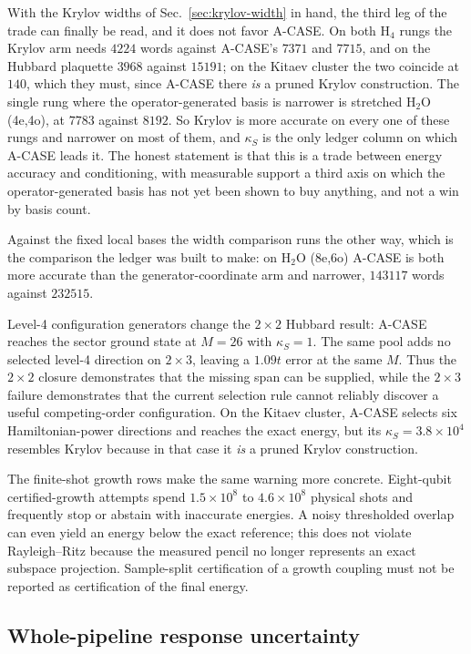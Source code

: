 \documentclass[aps,pra,reprint,superscriptaddress,nofootinbib,floatfix]{revtex4-2}
\begin{document}
With the Krylov widths of Sec.~\ref{sec:krylov-width} in hand, the third leg
of the trade can finally be read, and it does not favor A-CASE.  On both H$_4$
rungs the Krylov arm needs $4224$ words against A-CASE's $7371$ and $7715$,
and on the Hubbard plaquette $3968$ against $15191$; on the Kitaev cluster the
two coincide at $140$, which they must, since A-CASE there \emph{is} a pruned
Krylov construction.  The single rung where the operator-generated basis is
narrower is stretched H$_2$O (4e,4o), at $7783$ against $8192$.  So Krylov is
more accurate on every one of these rungs and narrower on most of them, and
$\kappa_S$ is the only ledger column on which A-CASE leads it.  The honest
statement is that this is a trade between energy accuracy and conditioning,
with measurable support a third axis on which the operator-generated basis has
not yet been shown to buy anything, and not a win by basis count.

Against the fixed local bases the width comparison runs the other way, which
is the comparison the ledger was built to make: on H$_2$O (8e,6o) A-CASE is
both more accurate than the generator-coordinate arm and narrower, $143117$
words against $232515$.

Level-4 configuration generators change the $2\times2$ Hubbard result:
A-CASE reaches the sector ground state at $M=26$ with
$\kappa_S=1$.  The same pool adds no selected level-4 direction on
$2\times3$, leaving a $1.09t$ error at the same $M$.  Thus the $2\times2$
closure demonstrates that the missing span can be supplied, while the
$2\times3$ failure demonstrates that the current selection rule cannot
reliably discover a useful competing-order configuration.  On the Kitaev
cluster, A-CASE selects six Hamiltonian-power directions and reaches the exact
energy, but its $\kappa_S=3.8\times10^4$ resembles Krylov because in that case
it \emph{is} a pruned Krylov construction.

The finite-shot growth rows make the same warning more concrete.  Eight-qubit
certified-growth attempts spend $1.5\times10^8$ to $4.6\times10^8$ physical
shots and frequently stop or abstain with inaccurate energies.  A noisy
thresholded overlap can even yield an energy below the exact reference; this
does not violate Rayleigh--Ritz because the measured pencil no longer
represents an exact subspace projection.  Sample-split certification of a
growth coupling must not be reported as certification of the final energy.

\subsection{Whole-pipeline response uncertainty}
\label{sec:results-response}
\end{document}
